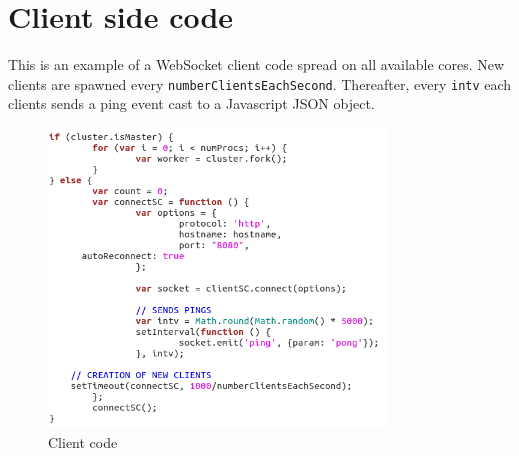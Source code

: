 \chapter{Client side code}
\label{client}

This is an example of a WebSocket client code spread on all available cores. New clients are spawned every \texttt{numberClientsEachSecond}. Thereafter, every \texttt{intv} each clients sends a ping event cast to a Javascript JSON object.

\begin{figure}[htbp]
	\centering
		\includegraphics[width=0.8\textwidth]{./Figures/client_code.png}
	\caption[client_code]{Client code}
	\label{fig:client_code}
\end{figure}
